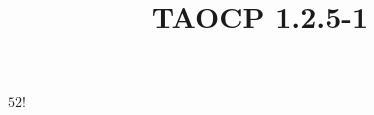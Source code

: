 \documentclass{article}
\title{TAOCP 1.2.5\mbox{-}1}
\begin{document}
\maketitle

\( 52! \)
\end{document}
